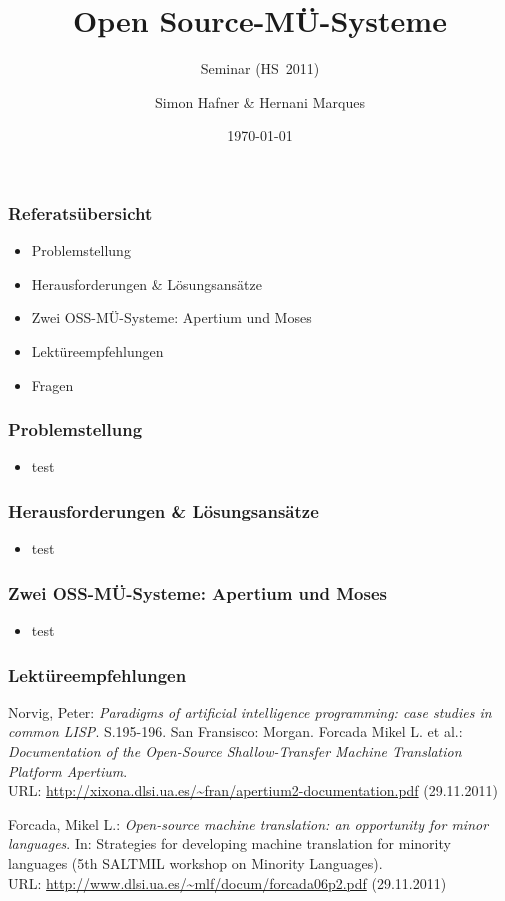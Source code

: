 \documentclass{clsemhs11-beamer}
\title{Open Source-MÜ-Systeme}
\subtitle{Seminar \q{Maschinelle \"Ubersetzung} (HS~2011)}
\author{Simon Hafner \& Hernani Marques}
\date{\today}
\begin{document}
  \maketitle

\begin{frame}
  \frametitle{Referatsübersicht}

  \begin{itemize}
  \item Problemstellung
  \item Herausforderungen \& Lösungsansätze
  \item Zwei OSS-MÜ-Systeme: Apertium und Moses
  \item Lektüreempfehlungen
  \item Fragen
  \end{itemize}
\end{frame}

\begin{frame}
  \frametitle{Problemstellung}
  \begin{itemize}
  \item test
  \end{itemize}
\end{frame}

\begin{frame}
  \frametitle{Herausforderungen \& Lösungsansätze}
  \begin{itemize}
  \item test
  \end{itemize}
\end{frame}

\begin{frame}
  \frametitle{Zwei OSS-MÜ-Systeme: Apertium und Moses}
  \begin{itemize}
  \item test
  \end{itemize}
\end{frame}

\begin{frame}
  \frametitle{Lektüreempfehlungen}

\begin{thebibliography}{...............}
Norvig, Peter: \emph{Paradigms of artificial intelligence programming: case studies in common LISP}. S.195-196. San Fransisco: Morgan.
Forcada Mikel L. et al.: \emph{Documentation of the Open-Source Shallow-Transfer Machine Translation Platform Apertium}.\\
URL: \url{http://xixona.dlsi.ua.es/~fran/apertium2-documentation.pdf} (29.11.2011)

Forcada, Mikel L.: \emph{Open-source machine translation: an opportunity for minor languages}. In: Strategies for developing machine translation for minority languages (5th SALTMIL workshop on Minority Languages).\\URL: \url{http://www.dlsi.ua.es/~mlf/docum/forcada06p2.pdf} (29.11.2011)
\end{thebibliography}

\end{frame}
\end{document}
